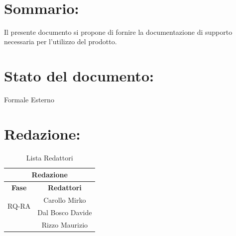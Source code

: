 \newpage
 
\begin{center} %
  \begin{Huge}  
        \textbf{\TITOLODOC}
      \\
  \end{Huge}
\end{center}
 
\section*{\LARGE Sommario:}
Il presente documento si propone di fornire la documentazione di supporto necessaria per l'utilizzo del prodotto.
 
\indent \indent
 
\section*{\LARGE Stato del documento:}
\indent \indent
  Formale Esterno
 
\section*{\LARGE Redazione:}
  \begin{table}[!h]
    \begin{center}
      \begin{tabular}
        {|c|c|}
        \hline
        \multicolumn{2}{|c|}{ \textbf{Redazione} } \\
        \hline
        \textbf{Fase} & \textbf{Redattori} \\
        \hline
        \multirow{2}{*}{RQ-RA} & Carollo Mirko\\
                    & Dal Bosco Davide\\
                    & Rizzo Maurizio\\
        
        \hline
      \end{tabular}
      \caption{Lista Redattori} %
      \label{tabredazione}
    \end{center}
  \end{table}
  
